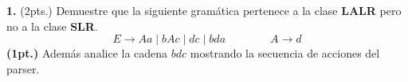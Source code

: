 \textbf{1.} {(2pts.)} Demuestre que la siguiente gram\'atica pertenece a la 
clase \textbf{LALR} pero no a la clase \textbf{SLR}.
\[
E \to Aa \mid bAc \mid dc \mid  bda \qquad \qquad A \to  d 
\]
\textbf{(1pt.)} Adem\'as analice la cadena $bdc$ mostrando la secuencia de
acciones del parser.
